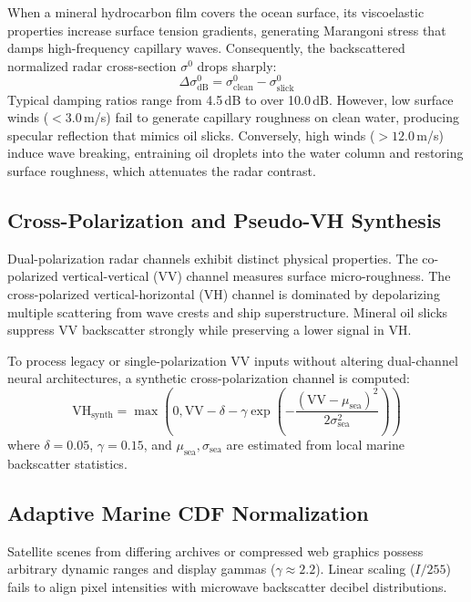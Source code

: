 \documentclass[conference]{IEEEtran}
\begin{document}
When a mineral hydrocarbon film covers the ocean surface, its viscoelastic properties increase surface tension gradients, generating Marangoni stress that damps high-frequency capillary waves. Consequently, the backscattered normalized radar cross-section $\sigma^0$ drops sharply:
\begin{equation}
\Delta \sigma^0_{\text{dB}} = \sigma^0_{\text{clean}} - \sigma^0_{\text{slick}}
\label{eq:damping}
\end{equation}
Typical damping ratios range from 4.5\,dB to over 10.0\,dB. However, low surface winds ($< 3.0$\,m/s) fail to generate capillary roughness on clean water, producing specular reflection that mimics oil slicks. Conversely, high winds ($> 12.0$\,m/s) induce wave breaking, entraining oil droplets into the water column and restoring surface roughness, which attenuates the radar contrast.

\subsection{Cross-Polarization and Pseudo-VH Synthesis}
Dual-polarization radar channels exhibit distinct physical properties. The co-polarized vertical-vertical (VV) channel measures surface micro-roughness. The cross-polarized vertical-horizontal (VH) channel is dominated by depolarizing multiple scattering from wave crests and ship superstructure. Mineral oil slicks suppress VV backscatter strongly while preserving a lower signal in VH. 

To process legacy or single-polarization VV inputs without altering dual-channel neural architectures, a synthetic cross-polarization channel is computed:
\begin{equation}
\text{VH}_{\text{synth}} = \max\left(0, \text{VV} - \delta - \gamma \exp\left( -\frac{(\text{VV} - \mu_{\text{sea}})^2}{2 \sigma_{\text{sea}}^2} \right)\right)
\label{eq:pseudo_vh}
\end{equation}
where $\delta = 0.05$, $\gamma = 0.15$, and $\mu_{\text{sea}}, \sigma_{\text{sea}}$ are estimated from local marine backscatter statistics.

\subsection{Adaptive Marine CDF Normalization}
Satellite scenes from differing archives or compressed web graphics possess arbitrary dynamic ranges and display gammas ($\gamma \approx 2.2$). Linear scaling ($I / 255$) fails to align pixel intensities with microwave backscatter decibel distributions.
\end{document}
